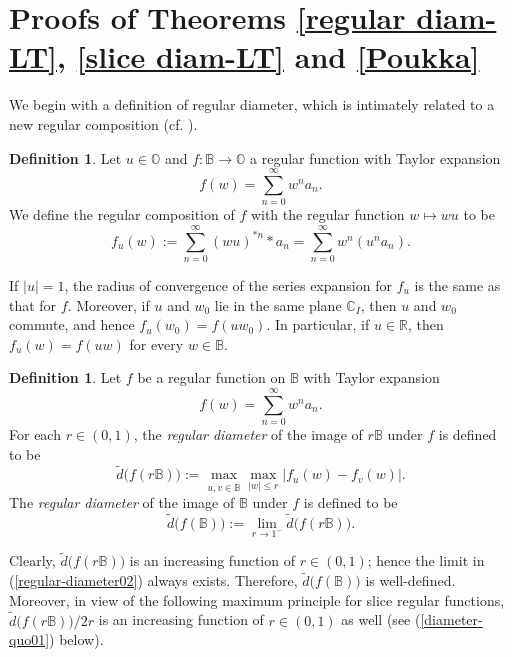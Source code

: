 \documentclass{amsart}
\theoremstyle{definition}
\newtheorem{definition}[theorem]{Definition}
\theoremstyle{remark}
\numberwithin{equation}{section}
\begin{document}
\section{Proofs of Theorems \ref{regular diam-LT}, \ref{slice diam-LT} and \ref{Poukka}}
We begin with a definition of regular diameter, which is intimately related to a new regular composition (cf. \cite{RW}).

\begin{definition}\label{regular-composition}
Let $u\in \mathbb O$ and $f:\mathbb B\rightarrow \mathbb O$   a regular function with  Taylor expansion
$$f(w)=\sum\limits_{n=0}^{\infty}w^na_n.$$
We define the regular composition of $f$ with the regular function $w\mapsto wu$  to be
$$f_u(w):=\sum\limits_{n=0}^{\infty}(wu)^{\ast n}\ast a_n=\sum\limits_{n=0}^{\infty}w^n(u^na_n).$$
\end{definition}
If $|u|=1$, the radius of convergence of the series expansion for $f_u$ is the same as that for $f$. Moreover, if $u$ and $w_0$ lie in the same plane $\mathbb C_I$, then $u$ and $w_0$ commute, and hence $f_u(w_0)=f(uw_0)$. In particular,  if $u\in \mathbb R$, then $f_u(w)=f(uw)$ for every $w\in\mathbb B$.

\begin{definition}\label{regular-diameter}
Let $f$ be a regular function on $\mathbb B$ with   Taylor expansion
$$f(w)=\sum\limits_{n=0}^{\infty}w^na_n.$$ For each $r\in(0, 1)$, the \textit{regular diameter} of the image of $r\mathbb B$ under $f$ is defined to be
\begin{equation}\label{regular-diameter01}
\widetilde{d}\big(f(r\mathbb B)\big):=\max_{u,v\in \overline{\mathbb B}}\max_{|w|\leq r}|f_u(w)-f_v(w)|.
\end{equation}
The \textit{regular diameter} of the image of $\mathbb B$ under $f$ is defined to be
\begin{equation}\label{regular-diameter02}
\widetilde{d}\big(f(\mathbb B)\big):=\lim_{r\rightarrow 1^-}\widetilde{d}\big(f(r\mathbb B)\big).
\end{equation}
\end{definition}

Clearly, $\widetilde{d}\big(f(r\mathbb B)\big)$ is an increasing function of $r\in(0,1)$; hence the limit in (\ref{regular-diameter02}) always exists. Therefore, $\widetilde{d}\big(f(\mathbb B)\big)$ is well-defined. Moreover, in view of the following maximum principle for slice regular functions, $\widetilde{d}\big(f(r\mathbb B)\big)/2r$ is an increasing function of $r\in(0,1)$ as well (see (\ref{diameter-quo01}) below).
\end{document}
